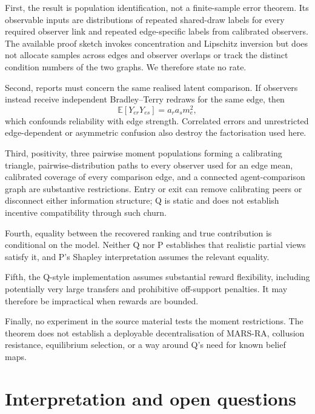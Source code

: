 \documentclass{article}
\begin{document}
First, the result is population identification, not a finite-sample error theorem.  Its observable inputs are distributions of repeated shared-draw labels for every required observer link and repeated edge-specific labels from calibrated observers.  The available proof sketch invokes concentration and Lipschitz inversion but does not allocate samples across edges and observer overlaps or track the distinct condition numbers of the two graphs.  We therefore state no rate. %

Second, reports must concern the same realised latent comparison.  If observers instead receive independent Bradley--Terry redraws for the same edge, then
\[
\mathbb{E}[Y_{er}Y_{es}]=a_ra_sm_e^2,
\]
which confounds reliability with edge strength. %
Correlated errors and unrestricted edge-dependent or asymmetric confusion also destroy the factorisation used here. %

Third, positivity, three pairwise moment populations forming a calibrating triangle, pairwise-distribution paths to every observer used for an edge mean, calibrated coverage of every comparison edge, and a connected agent-comparison graph are substantive restrictions.  Entry or exit can remove calibrating peers or disconnect either information structure; Q is static and does not establish incentive compatibility through such churn. %

Fourth, equality between the recovered ranking and true contribution is conditional on the model.  Neither Q nor P establishes that realistic partial views satisfy it, and P's Shapley interpretation assumes the relevant equality. %

Fifth, the Q-style implementation assumes substantial reward flexibility, including potentially very large transfers and prohibitive off-support penalties.  It may therefore be impractical when rewards are bounded. %

Finally, no experiment in the source material tests the moment restrictions.  The theorem does not establish a deployable decentralisation of MARS-RA, collusion resistance, equilibrium selection, or a way around Q's need for known belief maps. %

\section{Interpretation and open questions}
\end{document}
